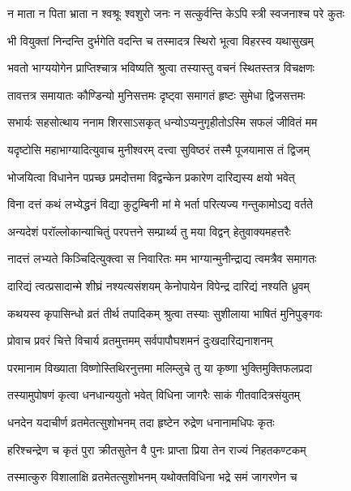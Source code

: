 \twolineshloka
{न माता न पिता भ्राता न श्वश्रूः श्वशुरो जनः}
{न सत्कुर्वन्ति केऽपि स्त्री स्वजनाश्च परे कुतः} %

\twolineshloka
{भी वियुक्तां निन्दन्ति दुर्भगेति वदन्ति च}
{तस्मादत्र स्थिरो भूत्वा विहरस्व यथासुखम्} %

\twolineshloka
{भवतो भाग्ययोगेन प्राप्तिश्चात्र भविष्यति}
{श्रुत्वा तस्यास्तु वचनं स्थितस्तत्र विचक्षणः} %

\twolineshloka
{तावत्तत्र समायातः कौण्डिन्यो मुनिसत्तमः}
{दृष्ट्वा समागतं हृष्टः सुमेधा द्विजसत्तमः} %

\twolineshloka
{सभार्यः सहसोत्थाय ननाम शिरसाऽसकृत्}
{धन्योऽप्यनुगृहीतोऽस्मि सफलं जीवितं मम} %

\twolineshloka
{यदृष्टोसि महाभाग्यादित्युवाच मुनीश्वरम्}
{दत्त्वा सुविष्ठरं तस्मै पूजयामास तं द्विजम्} %

\twolineshloka
{भोजयित्वा विधानेन पप्रच्छ प्रमदोत्तमा}
{विद्वन्केन प्रकारेण दारिद्यस्य क्षयो भवेत्} %

\twolineshloka
{विना दत्तं कथं लभ्येद्धनं विद्या कुटुम्बिनी}
{मां मे भर्ता परित्यज्य गन्तुकामोऽद्य वर्तते} %

\twolineshloka
{अन्यदेशं परॉल्लोकान्याचितुं परपत्तने}
{सम्प्रार्थ्य तु मया विद्वन् हेतुवाक्यमहत्तरैः} %

\twolineshloka
{नादत्तं लभ्यते किञ्चिदित्युक्त्वा स निवारितः}
{मम भाग्यान्मुनीन्द्राद्य त्वमत्रैव समागतः} %

\twolineshloka
{दारिद्यं त्वत्प्रसादान्मे शीघ्रं नश्यत्यसंशयम्}
{केनोपायेन विपेन्द्र दारिद्यं नश्यति ध्रुवम्} %

\twolineshloka
{कथयस्व कृपासिन्धो व्रतं तीर्थ तपादिकम्}
{श्रुत्वा तस्याः सुशीलाया भाषितं मुनिपुङ्गवः} %

\twolineshloka
{प्रोवाच प्रवरं चित्ते विचार्य व्रतमुत्तमम्}
{सर्वपापौघशमनं दुःखदारिद्यनाशनम्} %

\twolineshloka
{परमानाम विख्याता विष्णोस्तिथिरनुत्तमा}
{मलिम्लुचे तु या कृष्णा भुक्तिमुक्तिफलप्रदा} %

\twolineshloka
{तस्यामुपोषणं कृत्वा धनधान्ययुतो भवेत्}
{विधिना जागरैः साकं गीतवादित्रसंयुतम्} %

\twolineshloka
{धनदेन यदाचीर्ण व्रतमेतत्सुशोभनम्}
{तदा हृष्टेन रुद्रेण धनानामधिपः कृतः} %

\twolineshloka
{हरिश्चन्द्रेण च कृतं पुरा क्रीतसुतेन वै}
{पुनः प्राप्ता प्रिया तेन राज्यं निहतकण्टकम्} %

\twolineshloka
{तस्मात्कुरु विशालाक्षि व्रतमेतत्सुशोभनम्}
{यथोक्तविधिना भद्रे समं जागरणेन च} %

